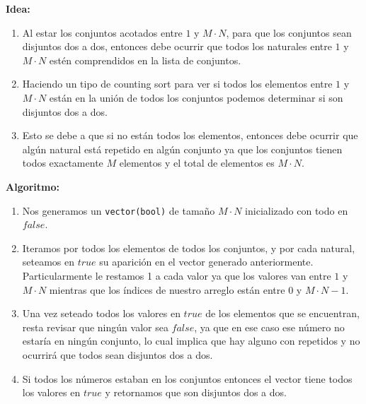 \documentclass[10pt, a4paper]{article}
\begin{document}
\textbf{Idea: }
\begin{enumerate}
  \item Al estar los conjuntos acotados entre $1$ y $M \cdot N$, para que los conjuntos sean disjuntos dos a dos, entonces debe ocurrir que todos los naturales entre $1$ y $M \cdot N$ est\'en comprendidos en la lista de conjuntos.
  \item Haciendo un tipo de counting sort para ver si todos los elementos entre $1$ y $M \cdot N$ est\'an en la uni\'on de todos los conjuntos podemos determinar si son disjuntos dos a dos.
  \item Esto se debe a que si no est\'an todos los elementos, entonces debe ocurrir que alg\'un natural est\'a repetido en alg\'un conjunto ya que los conjuntos tienen todos exactamente $M$ elementos y el total de elementos es $M \cdot N$.
\end{enumerate}

\textbf{Algoritmo: }
\begin{enumerate}
  \item Nos generamos un \texttt{vector(bool)} de tama\~no $M \cdot N$ inicializado con todo en $false$.
  \item Iteramos por todos los elementos de todos los conjuntos, y por cada natural, seteamos en $true$ su aparici\'on en el vector generado anteriormente. Particularmente le restamos 1 a cada valor ya que los valores van entre $1$ y $M \cdot N$ mientras que los \'indices de nuestro arreglo est\'an entre $0$ y $M \cdot N - 1$.
  \item Una vez seteado todos los valores en $true$ de los elementos que se encuentran, resta revisar que ning\'un valor sea $false$, ya que en ese caso ese n\'umero no estar\'ia en ning\'un conjunto, lo cual implica que hay alguno con repetidos y no ocurrir\'a que todos sean disjuntos dos a dos.
  \item Si todos los n\'umeros estaban en los conjuntos entonces el vector tiene todos los valores en $true$ y retornamos que son disjuntos dos a dos.
\end{enumerate}
\end{document}
